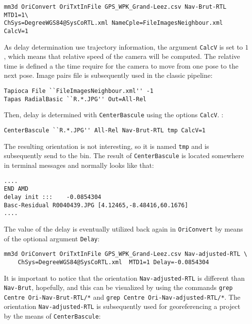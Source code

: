 \begin{verbatim}
mm3d OriConvert OriTxtInFile GPS_WPK_Grand-Leez.csv Nav-Brut-RTL MTD1=1\
ChSys=DegreeWGS84@SysCoRTL.xml NameCple=FileImagesNeighbour.xml CalcV=1
\end{verbatim}

As delay determination use trajectory information, the argument {\tt CalcV} is set to $1$, which means that relative speed of the camera will be computed. The relative time is defined a the time require for the camera to move from one pose to the next pose.
Image pairs file is subsequently used in the classic pipeline:

\begin{verbatim}
Tapioca File ``FileImagesNeighbour.xml'' -1
Tapas RadialBasic ``R.*.JPG'' Out=All-Rel
\end{verbatim}

Then, delay is determined with {\tt CenterBascule} using the options {\tt CalcV}.  :

\begin{verbatim}
CenterBascule ``R.*.JPG'' All-Rel Nav-Brut-RTL tmp CalcV=1
\end{verbatim}

The resulting orientation is not interesting, so it is named {\tt tmp} and is subsequently send to the bin. The result of {\tt CenterBascule} is located somewhere in terminal messages and normally looks like that:

\begin{verbatim}
....
END AMD 
delay init :::    -0.0854304
Basc-Residual R0040439.JPG [4.12465,-8.48416,60.1676]
....
\end{verbatim}

The value of the delay is eventually utilized back again in {\tt OriConvert} by means of the optional argument {\tt Delay}:

\begin{verbatim}
mm3d OriConvert OriTxtInFile GPS_WPK_Grand-Leez.csv Nav-adjusted-RTL \
	ChSys=DegreeWGS84@SysCoRTL.xml 	MTD1=1 Delay=-0.0854304
\end{verbatim}

It is important to notice that the orientation {\tt  Nav-adjusted-RTL} is different than {\tt Nav-Brut}, hopefully, and this can be visualized by using the commands {\tt grep Centre Ori-Nav-Brut-RTL/*} and {\tt grep Centre Ori-Nav-adjusted-RTL/*}. The orientation {\tt  Nav-adjusted-RTL} is subsequently used for georeferencing a project by the means of {\tt CenterBascule}:

